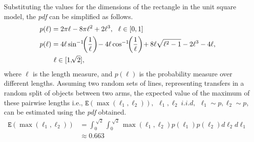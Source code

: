 {%
Substituting the values for the dimensions of the rectangle in the unit square model, the \textit{pdf} can be simplified as follows.
\begin{align*}
p(\ell)&= 2\pi \ell - 8\pi \ell^2 + 2\ell^3, \ \ \ell\in[0,1]\\
p(\ell)&= 4\ell\sin^{-1}\!\!\left(\frac{1}{\ell}\right)\!- 4\ell\cos^{-1}\!\!\left(\frac{1}{\ell}\right)\!+ 8\ell\sqrt{\ell^2-1} -2\ell^3 -4\ell,\\ &\ \ell\in[1,\sqrt[]{2}],
\end{align*}
where $\ell$ is the length measure, and $p(\ell)$ is the probability measure over different lengths.
Assuming two random sets of lines, representing transfers in a random split of objects between two arms, the expected value of the maximum of these pairwise lengths i.e., $\mathtt{E}(\max(\ell_1,\ell_2)), \ \ \ell_1,\ell_2\ i.i.d, \ \ \ell_1 \sim p, \ell_2 \sim p$, can be estimated using the \textit{pdf} obtained. 
\begin{align*}
\mathtt{E}(\max(\ell_1,\ell_2)) &= \int_0^{\sqrt[]{2}} \int_0^{\sqrt[]{2}} \max(\ell_1,\ell_2)p(\ell_1)p(\ell_2) d\ell_2 d\ell_1\\&\approx 0.663
\end{align*}

}

